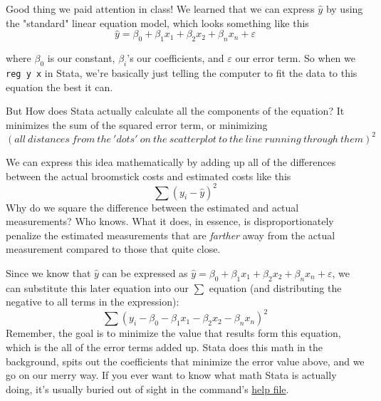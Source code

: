 \documentclass{article}                 %
\begin{document}
	Good thing we paid attention in class! We learned that we can express $\hat{y}$ by using the "standard" linear equation model, which looks something like this $$\hat{y} = \beta_0 + \beta_{1}x_1 + \beta_{2}x_2 + \beta_{n}x_n + \varepsilon$$

	where $\beta_0$ is our constant, $\beta_i$'s our coefficients, and $\varepsilon$ our error term. So when we \texttt{reg y x} in Stata, we're basically just telling the computer to fit the data to this equation the best it can.

	But How does Stata actually calculate all the components of the equation? It minimizes the sum of the squared error term, or minimizing $$(all\:distances \:from \:the \:'dots' \:on \:the \:scatterplot \:to \:the \:line \:running \:through \:them)^2$$

	We can express this idea mathematically by adding up all of the differences between the actual broomstick costs and estimated costs like this $$\sum(y_i - \hat{y})^2  $$ Why do we square the difference between the estimated and actual measurements? Who knows. What it does, in essence, is disproportionately penalize the estimated measurements that are \textit{farther} away from the actual measurement compared to those that quite close. 

	Since we know that $\hat{y}$ can be expressed as $\hat{y} = \beta_0 + \beta_{1}x_1 + \beta_{2}x_2 + \beta_{n}x_n + \varepsilon$, we can substitute this later equation into our $\sum$ equation (and distributing the negative to all terms in the expression): $$\sum(y_i - \beta_0 - \beta_{1}x_1 - \beta_{2}x_2 - \beta_{n}x_n )^2  $$
	Remember, the goal is to minimize the value that results form this equation, which is the all of the error terms added up. Stata does this math in the background, spits out the coefficients that minimize the error value above, and we go on our merry way. If you ever want to know what math Stata is actually doing, it's usually buried out of sight in the command's \href{https://www.stata.com/manuals13/rregress.pdf}{help file}.
\end{document}
